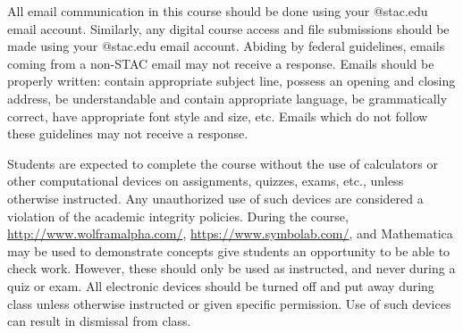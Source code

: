 \documentclass[11pt,letterpaper]{article}
\begin{document}
All email communication in this course should be done using your @stac.edu email account. Similarly, any digital course access and file submissions should be made using your @stac.edu email account. Abiding by federal guidelines, emails coming from a non-STAC email may not receive a response. Emails should be properly written: contain appropriate subject line, possess an opening and closing address, be understandable and contain appropriate language, be grammatically correct, have appropriate font style and size, etc. Emails which do not follow these guidelines may not receive a response.
\sectionbreak



Students are expected to complete the course without the use of calculators or other computational devices on assignments, quizzes, exams, etc., unless otherwise instructed. Any unauthorized use of such devices are considered a violation of the academic integrity policies. During the course, \href{http://www.wolframalpha.com/}{http://www.wolframalpha.com/}, \href{https://www.symbolab.com/}{https://www.symbolab.com/}, and Mathematica may be used to demonstrate concepts give students an opportunity to be able to check work. However, these should only be used as instructed, and never during a quiz or exam. All electronic devices should be turned off and put away during class unless otherwise instructed or given specific permission. Use of such devices can result in dismissal from class.
\sectionbreak
\end{document}
